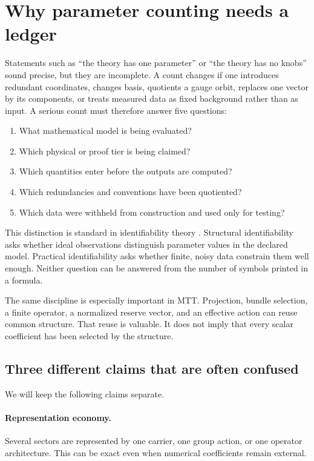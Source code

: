 \documentclass[11pt]{article}
\begin{document}
\tableofcontents

\section{Why parameter counting needs a ledger}

Statements such as ``the theory has one parameter'' or ``the theory has no
knobs'' sound precise, but they are incomplete. A count changes if one
introduces redundant coordinates, changes basis, quotients a gauge orbit,
replaces one vector by its components, or treats measured data as fixed
background rather than as input. A serious count must therefore answer five
questions:
\begin{enumerate}
\item What mathematical model is being evaluated?
\item Which physical or proof tier is being claimed?
\item Which quantities enter before the outputs are computed?
\item Which redundancies and conventions have been quotiented?
\item Which data were withheld from construction and used only for testing?
\end{enumerate}

This distinction is standard in identifiability theory
\cite{BellmanAstrom1970,RaueEtAl2009}. Structural identifiability asks whether
ideal observations distinguish parameter values in the declared model.
Practical identifiability asks whether finite, noisy data constrain them well
enough. Neither question can be answered from the number of symbols printed
in a formula.

The same discipline is especially important in MTT. Projection, bundle
selection, a finite operator, a normalized reserve vector, and an effective
action can reuse common structure. That reuse is valuable. It does not imply
that every scalar coefficient has been selected by the structure.

\subsection{Three different claims that are often confused}

We will keep the following claims separate.

\paragraph{Representation economy.}
Several sectors are represented by one carrier, one group action, or one
operator architecture. This can be exact even when numerical coefficients
remain external.
\end{document}
